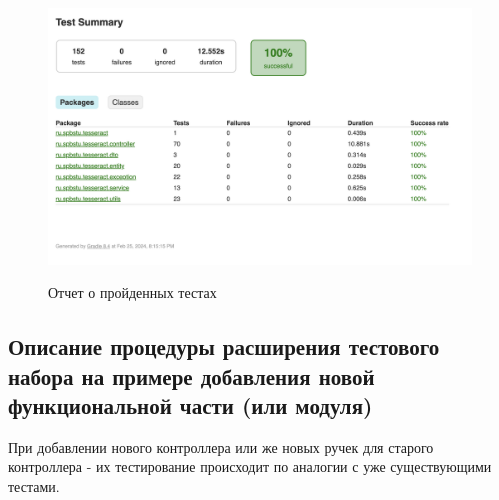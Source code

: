 \documentclass[a4paper, 14pt]{article}
\begin{document}
\begin{figure}[H]
    \centering
    \includegraphics[width=15cm]{resources/3.png}\\
    \caption{Отчет о пройденных тестах}
\end{figure}

\subsection{Описание процедуры расширения тестового набора на примере добавления новой функциональной части (или модуля)}

При добавлении нового контроллера или же новых ручек для старого контроллера - их тестирование происходит по аналогии с уже существующими тестами.
\end{document}
